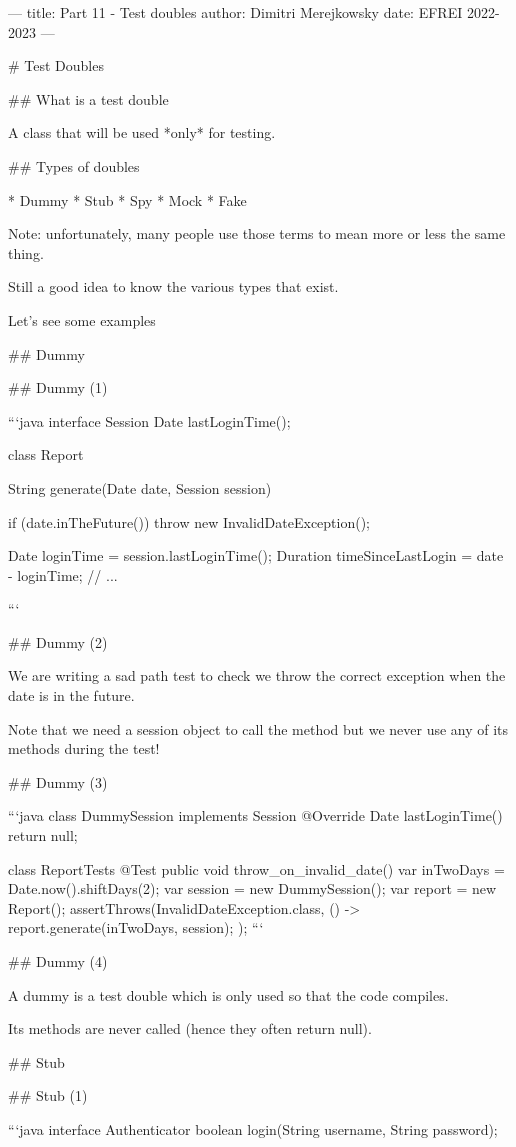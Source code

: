 ---
title: Part 11 - Test doubles
author: Dimitri Merejkowsky
date: EFREI 2022-2023
---

#  Test Doubles

## What is a test double

A class that will be used *only* for testing.

## Types of doubles

* Dummy
* Stub
* Spy
* Mock
* Fake

Note: unfortunately, many people use those terms to mean more or less
the same thing.

Still a good idea to know the various types that exist.

Let's see some examples

## Dummy

## Dummy (1)

```java
interface Session {
  Date lastLoginTime();
}


class Report {
  String generate(Date date, Session session) {
    if (date.inTheFuture()) {
      throw new InvalidDateException();
    }

    Date loginTime = session.lastLoginTime();
    Duration timeSinceLastLogin = date - loginTime;
    // ...
  }
}
```

## Dummy (2)

We are writing a sad path test to check we throw the correct
exception when the date is in the future.

Note that we need a session object to call the method but we never
use any of its methods during the test!

## Dummy (3)

```java
class DummySession implements Session {
  @Override
  Date lastLoginTime()  {
     return null;
  }
}

class ReportTests {
  @Test
  public void throw_on_invalid_date() {
    var inTwoDays = Date.now().shiftDays(2);
    var session = new DummySession();
    var report = new Report();
    assertThrows(InvalidDateException.class, () -> {
        report.generate(inTwoDays, session);
    });
  }
}
```

## Dummy (4)

A dummy is a test double which is only used so that the code compiles.

Its methods are never called (hence they often return null).

## Stub

## Stub (1)


```java
interface Authenticator {
  boolean login(String username, String password);
}


